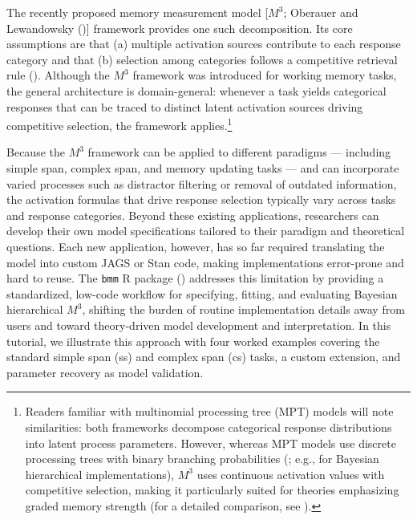 \documentclass[
  man,
  floatsintext,
  longtable,
  nolmodern,
  notxfonts,
  notimes,
  colorlinks=true,linkcolor=blue,citecolor=blue,urlcolor=blue]{apa7}
\begin{document}
The recently proposed memory measurement model {[}\(M^3\); Oberauer and
Lewandowsky (){]} framework
provides one such decomposition. Its core assumptions are that (a)
multiple activation sources contribute to each response category and
that (b) selection among categories follows a competitive retrieval rule
(). Although the \(M^3\)
framework was introduced for working memory tasks, the general
architecture is domain-general: whenever a task yields categorical
responses that can be traced to distinct latent activation sources
driving competitive selection, the framework applies.\footnote{Readers
  familiar with multinomial processing tree (MPT) models will note
  similarities: both frameworks decompose categorical response
  distributions into latent process parameters. However, whereas MPT
  models use discrete processing trees with binary branching
  probabilities (; e.g.,  for Bayesian hierarchical implementations), \(M^3\) uses
  continuous activation values with competitive selection, making it
  particularly suited for theories emphasizing graded memory strength
  (for a detailed comparison, see
  ).}

Because the \(M^3\) framework can be applied to different paradigms ---
including simple span, complex span, and memory updating tasks --- and
can incorporate varied processes such as distractor filtering or removal
of outdated information, the activation formulas that drive response
selection typically vary across tasks and response categories. Beyond
these existing applications, researchers can develop their own model
specifications tailored to their paradigm and theoretical questions.
Each new application, however, has so far required translating the model
into custom JAGS or Stan code, making implementations error-prone and
hard to reuse. The \texttt{bmm} R package () addresses this limitation by providing a standardized,
low-code workflow for specifying, fitting, and evaluating Bayesian
hierarchical \(M^3\), shifting the burden of routine implementation
details away from users and toward theory-driven model development and
interpretation. In this tutorial, we illustrate this approach with four
worked examples covering the standard simple span (ss) and complex span
(cs) tasks, a custom extension, and parameter recovery as model
validation.
\end{document}
